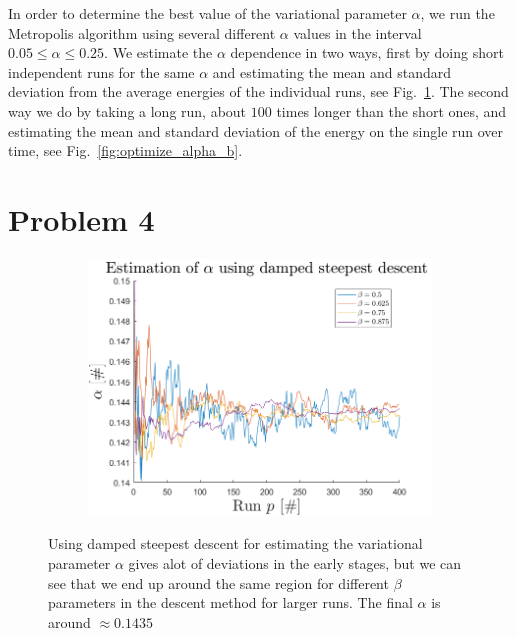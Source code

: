 In order to determine the best value of the variational parameter $\alpha$, we run the Metropolis algorithm using several different $\alpha$ values in the interval $0.05 \leq \alpha \leq 0.25$. We estimate the $\alpha$ dependence in two ways, first by doing short independent runs for the same $\alpha$ and estimating the mean and standard deviation from the average energies of the individual runs, see Fig.~\ref{fig:optimize_alpha_a}. The second way we do by taking a long run, about $100$ times longer than the short ones, and estimating the mean and standard deviation of the energy on the single run over time, see Fig.~\ref{fig:optimize_alpha_b}. 

\section*{Problem 4}

\begin{figure}[H]
	\centering
	\captionsetup[subfigure]{justification=centering}
	\begin{subfigure}[b]{0.7\textwidth}
		\centering
		\includegraphics[width=\textwidth]{graphics/task4/beta_dep.png}
		\caption{}
		\label{fig:optimize_alpha_a}
	\end{subfigure}
	\caption{Using damped steepest descent for estimating the variational parameter $\alpha$ gives alot of deviations in the early stages, but we can see that we end up around the same region for different $\beta$ parameters in the descent method for larger runs. The final $\alpha$ is around $\approx 0.1435$}
	\label{fig:beta_dep}
\end{figure}


